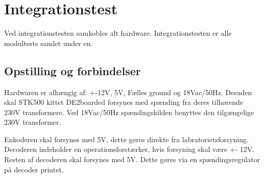 \section{Integrationstest}
Ved integrationstesten samkobles alt hardware. Integrationstesten er alle modultests samlet under en. 

\subsection{Opstilling og forbindelser}
Hardwaren er afhængig af: +-12V, 5V, Fælles ground og 18Vac/50Hz. Desuden skal STK500 kittet DE2boarded forsynes med spænding fra deres tilhørende 230V transformere. Ved 18Vac/50Hz spændingskilden benyttes den tilgængelige 230V transformer. 

Enkoderen skal forsynes med 5V, dette gøres direkte fra labratorietsforsyning.
Decoderen indeholder en operationsforstærker, hvis forsyning skal være +- 12V. Resten af decoderen skal forsynes med 5V. Dette gøres via en spændingsregulator på decoder printet.   

